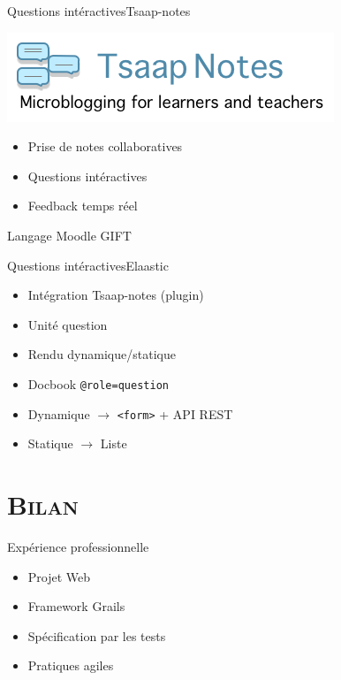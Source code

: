 \documentclass[xcolor=x11names,compress]{beamer}
\renewcommand{\(}{\begin{columns}}
\renewcommand{\)}{\end{columns}}
\newcommand{\<}[1]{\begin{column}{#1}}
\renewcommand{\>}{\end{column}}
\begin{document}
\begin{frame}{Questions intéractives}{Tsaap-notes}
  \begin{center}
	\includegraphics[scale=0.4]{images/tsaap}
	\vfill
	\begin{itemize}
	  \item Prise de notes collaboratives
	  \item Questions intéractives
	  \item Feedback temps réel
	\end{itemize}
	\vfill
	Langage Moodle GIFT
  \end{center}
\end{frame}

\begin{frame}{Questions intéractives}{Elaastic}
  \begin{itemize}
	\item Intégration Tsaap-notes (plugin)
	\item \og Unité question \fg{}
	\item Rendu dynamique/statique
  \end{itemize}
  \pause
  \vfill
  \begin{itemize}
	\item Docbook {\tt @role=question}
	\item Dynamique $\rightarrow$ {\tt <form>} + API REST
	\item Statique $\rightarrow$ Liste
  \end{itemize}
\end{frame}


\section{\scshape Bilan}
\begin{frame}{Expérience professionnelle}
  \vfill
  \begin{itemize}
	\item Projet Web
	\item Framework Grails
	\item Spécification par les tests
	\item Pratiques agiles
  \end{itemize}
  \vfill
\end{frame}
\end{document}
